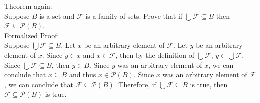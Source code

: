 \documentclass{article}
\begin{document}
\noindent Theorem again:\\
Suppose $B$ is a set and $\mathcal{F}$ is a family of sets. Prove that if $\bigcup \mathcal{F} \subseteq B$ then $\mathcal{F} \subseteq \mathcal{P}(B)$.\\

\noindent Formalized Proof:\\
Suppose $\bigcup \mathcal{F} \subseteq B$. Let $x$ be an arbitrary element of $\mathcal{F}$. Let $y$ be an arbitrary element of $x$. Since $y \in x$ and $x \in \mathcal{F}$, then by the definition of $\bigcup \mathcal{F}$, $y \in \bigcup \mathcal{F}$. Since $\bigcup \mathcal{F} \subseteq B$, then $y \in B$. Since $y$ was an arbitrary element of $x$, we can conclude that $x \subseteq B$ and thus $x \in \mathcal{P}(B)$. Since $x$ was an arbitrary element of $\mathcal{F}$, we can conclude that $\mathcal{F} \subseteq \mathcal{P}(B)$. Therefore, if $\bigcup \mathcal{F} \subseteq B$ is true, then $\mathcal{F} \subseteq \mathcal{P}(B)$ is true.

\clearpage
\printglossary[type=\acronymtype,style=long]  %
\printglossary[type=symbolslist,style=long]   %
\printglossary[type=main]                     %
\end{document}

